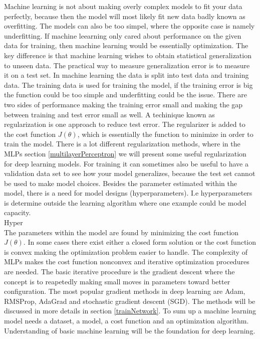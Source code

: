 Machine learning is not about making overly complex models to fit your data perfectly, because then the model will most likely fit new data badly known as overfitting. The models can also be too simpel, where the opposite case is namely underfitting. If machine leearning only cared about performance on the given data for training, then machine learning would be essentially optimization. The key difference is that machine learning wishes to obtain statistical generalization to unseen data. The practical way to measure generalization error is to measure it on a test set. In machine learning the data is split into test data and training data. The training data is used for training the model, if the training error is big the function could be too simple and underfitting could be the issue. There are two sides of performance making the training error small and making the gap between training and test error small as well. A techinique known as regularization is one approach to reduce test error. The regularizer is added to the cost function $J(\theta)$, which is essentially the function to minimize in order to train the model. There is a lot different regularization methods, where in the MLPs section \ref{multilayerPerceptron} we will present some useful regularization for deep learning models. For training it can sometimes also be useful to have a validation data set to see how your model generalizes, because the test set cannot be used to make model choices. Besides the parameter estimated within the model, there is a need for model designs (hyperparameters). I.e hyperparameters is determine outside the learning algorithm where one example could be model capacity.\\

Hyper\\

The parameters within the model are found by minimizing the cost function $J(\theta)$. In some cases there exist either a closed form solution or the cost function is convex making the optimization problem easier to handle. The complexity of MLPs makes the cost function nonconvex and iterative optimization procedures are needed. The basic iterative procedure is the gradient descent where the concept is to reapetedly making small moves in parameters toward better configuration. The most popular gradient methods in deep learning are Adam, RMSProp, AdaGrad and stochastic gradient descent (SGD). The methods will be discussed in more details in section \ref{trainNetwork}. To sum up a machine learning model needs a dataset, a model, a cost function and an optimization algorithm. Understanding of basic machine learning will be the foundation for deep learning.\\

